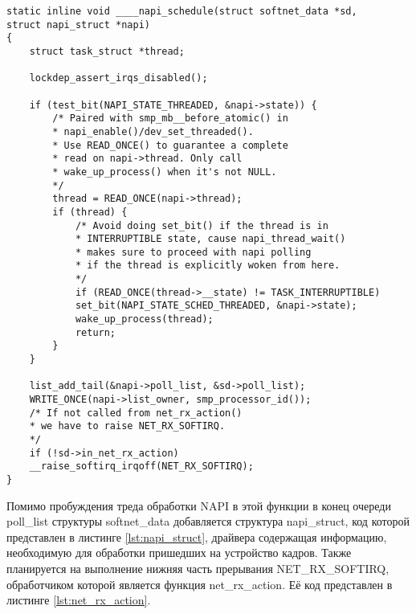 \begin{center}
	\captionsetup{justification=raggedright,singlelinecheck=off}
	\begin{lstlisting}[label=lst:napi_schedule,caption=Код функции \_\_\_\_napi\_schedule,showstringspaces=false]
static inline void ____napi_schedule(struct softnet_data *sd,
struct napi_struct *napi)
{
	struct task_struct *thread;
	
	lockdep_assert_irqs_disabled();
	
	if (test_bit(NAPI_STATE_THREADED, &napi->state)) {
		/* Paired with smp_mb__before_atomic() in
		* napi_enable()/dev_set_threaded().
		* Use READ_ONCE() to guarantee a complete
		* read on napi->thread. Only call
		* wake_up_process() when it's not NULL.
		*/
		thread = READ_ONCE(napi->thread);
		if (thread) {
			/* Avoid doing set_bit() if the thread is in
			* INTERRUPTIBLE state, cause napi_thread_wait()
			* makes sure to proceed with napi polling
			* if the thread is explicitly woken from here.
			*/
			if (READ_ONCE(thread->__state) != TASK_INTERRUPTIBLE)
			set_bit(NAPI_STATE_SCHED_THREADED, &napi->state);
			wake_up_process(thread);
			return;
		}
	}
	
	list_add_tail(&napi->poll_list, &sd->poll_list);
	WRITE_ONCE(napi->list_owner, smp_processor_id());
	/* If not called from net_rx_action()
	* we have to raise NET_RX_SOFTIRQ.
	*/
	if (!sd->in_net_rx_action)
	__raise_softirq_irqoff(NET_RX_SOFTIRQ);
}

	\end{lstlisting}
\end{center}
\FloatBarrier

Помимо пробуждения треда обработки NAPI в этой функции в конец очереди poll\_list структуры  softnet\_data добавляется структура  napi\_struct, код которой представлен в листинге \ref{lst:napi_struct}, драйвера содержащая информацию, необходимую для обработки пришедших на устройство кадров. Также планируется на выполнение нижняя часть прерывания NET\_RX\_SOFTIRQ, обработчиком  которой является функция net\_rx\_action. Её код представлен в листинге \ref{lst:net_rx_action}.

